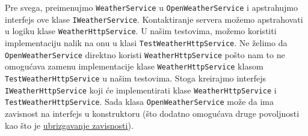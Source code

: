 Pre svega, preimenujmo \texttt{WeatherService} u \texttt{OpenWeatherService} i apstrahujmo interfejs ove klase \texttt{IWeatherService}. Kontaktiranje servera možemo apstrahovati u logiku klase \texttt{WeatherHttpService}. U našim testovima, možemo koristiti implementaciju nalik na onu u klasi \texttt{TestWeatherHttpService}. Ne želimo da \texttt{OpenWeatherService} direktno koristi \texttt{WeatherHttpService} pošto nam to ne omogućava zamenu implementacije klase \texttt{WeatherHttpService} klasom \texttt{TestWeatherHttpService} u našim testovima. Stoga kreirajmo interfejs \texttt{IWeatherHttpService} koji će implementirati klase \texttt{WeatherHttpService} i \texttt{TestWeatherHttpService}. Sada klasa \texttt{OpenWeatherService} može da ima zavisnost na interfejs u konstruktoru (što dodatno omogućava druge povoljnosti kao što je \href{https://www.digitalocean.com/community/tutorials/java-dependency-injection-design-pattern-example-tutorial}{ubrizgavanje zavisnosti}).
